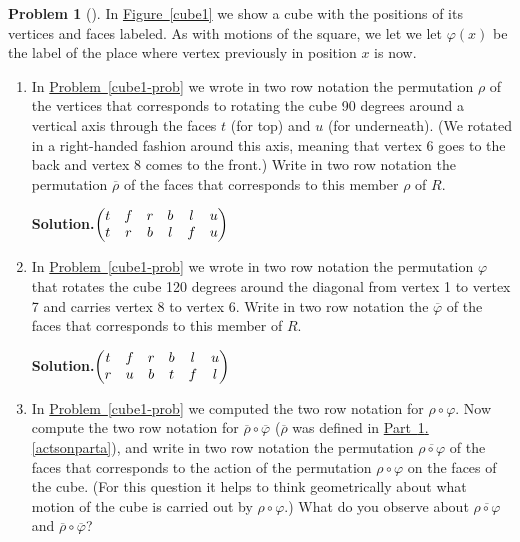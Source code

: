 \documentclass[10pt,]{book}
\theoremstyle{plain}
\theoremstyle{definition}
\newtheorem{activity}[project]{Problem}
\theoremstyle{definition}
\numberwithin{equation}{chapter}
\newcommand{\amp}{&}
\begin{document}
\begin{activity}[]\label{activity-280}
In \hyperref[cube1]{Figure~\ref{cube1}} we show a cube with the positions of its vertices and faces labeled. As with motions of the square, we let we let \(\varphi(x)\) be the label of the place where vertex previously in position \(x\) is now.%
\begin{enumerate}[font=\bfseries,label=(\alph*),ref=\alph*]
\item\label{actsonparta} In \hyperref[cube1-prob]{Problem~\ref{cube1-prob}} we wrote in two row notation the permutation \(\rho\) of the vertices that corresponds to rotating the cube 90 degrees around a vertical axis through the faces \(t\) (for top) and \(u\) (for underneath). (We rotated in a right-handed fashion around this axis, meaning that vertex 6 goes to the back and vertex 8 comes to the front.) Write in two row notation the permutation \(\overline{\rho}\) of the faces that corresponds to this member \(\rho\) of \(R\). %
\par\medskip\noindent%
\textbf{Solution.}\quad  \(\begin{pmatrix}t\amp f\amp r\amp b\amp l\amp u\cr t\amp r\amp b\amp l\amp f\amp u
\end{pmatrix}\)%
\item\label{task-202} In \hyperref[cube1-prob]{Problem~\ref{cube1-prob}} we wrote in two row notation the permutation \(\varphi\) that rotates the cube 120 degrees around the diagonal from vertex 1 to vertex 7 and carries vertex 8 to vertex 6.  Write in two row notation the \(\overline{\varphi}\) of the faces that corresponds to this member of \(R\).%
\par\medskip\noindent%
\textbf{Solution.}\quad \(\begin{pmatrix}t\amp f\amp r\amp b\amp l\amp u\cr r\amp u\amp b\amp t\amp f\amp l
\end{pmatrix}\)%
\item\label{cube2} In \hyperref[cube1-prob]{Problem~\ref{cube1-prob}} we computed the two row notation for \(\rho\circ\varphi\). Now compute the two row notation for \(\overline{\rho}\circ\overline{\varphi}\) (\(\overline{\rho}\) was defined in \hyperref[actsonparta]{Part~\ref{activity-280}.\ref{actsonparta}}), and write in two row notation the permutation \(\overline{\rho\circ\varphi}\) of the faces that corresponds to the action of the permutation \(\rho\circ\varphi\) on the faces of the cube. (For this question it helps to think geometrically about what motion of the cube is carried out by \(\rho\circ\varphi\).)  What do you observe about \(\overline{\rho\circ\varphi}\) and \(\overline{\rho}\circ\overline{\varphi}\)?%

\end{enumerate}
\end{activity}
\end{document}
